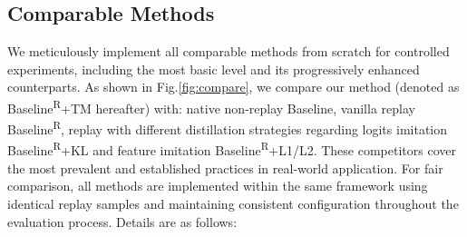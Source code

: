 \subsection{Comparable Methods}
We meticulously implement all comparable methods from scratch for controlled experiments, including the most basic level and its progressively enhanced counterparts.
As shown in Fig.\ref{fig:compare}, we compare our method (denoted as Baseline\textsuperscript{R}+TM hereafter) with: native non-replay Baseline, vanilla replay Baseline\textsuperscript{R}, replay with different distillation strategies regarding logits imitation Baseline\textsuperscript{R}+KL and feature imitation Baseline\textsuperscript{R}+L1/L2.
These competitors cover the most prevalent and established practices in real-world application.
For fair comparison, all methods are implemented within the same framework using identical replay samples and maintaining consistent configuration throughout the evaluation process. Details are as follows:

